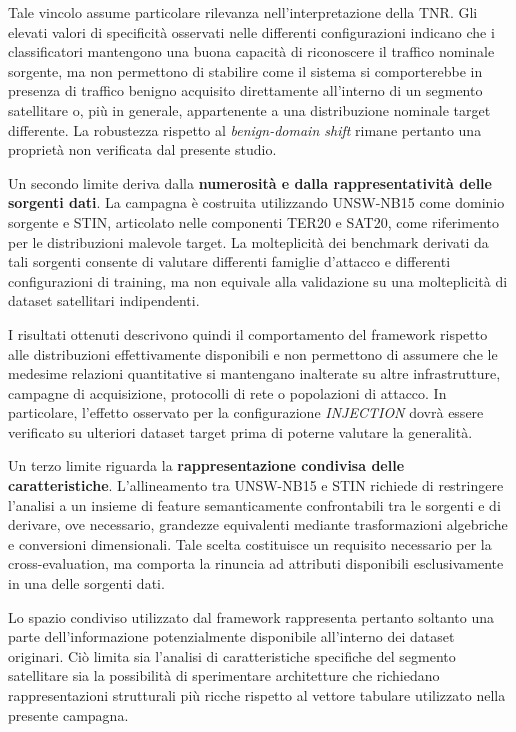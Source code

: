 Tale vincolo assume particolare rilevanza nell'interpretazione della TNR.
Gli elevati valori di specificità osservati nelle differenti configurazioni indicano che i classificatori mantengono una buona capacità di riconoscere il traffico nominale sorgente, ma non permettono di stabilire come il sistema si comporterebbe in presenza di traffico benigno acquisito direttamente all'interno di un segmento satellitare o, più in generale, appartenente a una distribuzione nominale target differente.
La robustezza rispetto al \textit{benign-domain shift} rimane pertanto una proprietà non verificata dal presente studio.

Un secondo limite deriva dalla \textbf{numerosità e dalla rappresentatività delle sorgenti dati}.
La campagna è costruita utilizzando UNSW-NB15 come dominio sorgente e STIN, articolato nelle componenti TER20 e SAT20, come riferimento per le distribuzioni malevole target.
La molteplicità dei benchmark derivati da tali sorgenti consente di valutare differenti famiglie d'attacco e differenti configurazioni di training, ma non equivale alla validazione su una molteplicità di dataset satellitari indipendenti.

I risultati ottenuti descrivono quindi il comportamento del framework rispetto alle distribuzioni effettivamente disponibili e non permettono di assumere che le medesime relazioni quantitative si mantengano inalterate su altre infrastrutture, campagne di acquisizione, protocolli di rete o popolazioni di attacco.
In particolare, l'effetto osservato per la configurazione \textit{INJECTION} dovrà essere verificato su ulteriori dataset target prima di poterne valutare la generalità.

Un terzo limite riguarda la \textbf{rappresentazione condivisa delle caratteristiche}.
L'allineamento tra UNSW-NB15 e STIN richiede di restringere l'analisi a un insieme di feature semanticamente confrontabili tra le sorgenti e di derivare, ove necessario, grandezze equivalenti mediante trasformazioni algebriche e conversioni dimensionali.
Tale scelta costituisce un requisito necessario per la cross-evaluation, ma comporta la rinuncia ad attributi disponibili esclusivamente in una delle sorgenti dati.

Lo spazio condiviso utilizzato dal framework rappresenta pertanto soltanto una parte dell'informazione potenzialmente disponibile all'interno dei dataset originari.
Ciò limita sia l'analisi di caratteristiche specifiche del segmento satellitare sia la possibilità di sperimentare architetture che richiedano rappresentazioni strutturali più ricche rispetto al vettore tabulare utilizzato nella presente campagna.


